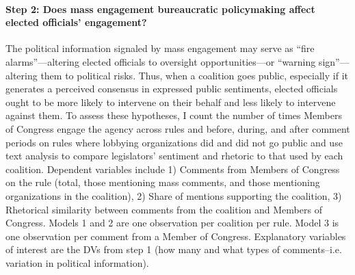 \paragraph{Step 2: Does mass engagement bureaucratic policymaking affect elected officials' engagement?}
The political information signaled by mass engagement may serve as ``fire alarms''---altering elected officials to oversight opportunities---or ``warning sign''---altering them to political risks.
Thus, when a coalition goes public, especially if it generates a perceived consensus in expressed public sentiments, elected officials ought to be more likely to intervene on their behalf and less likely to intervene against them.  
To assess these hypotheses, I count the number of times Members of Congress engage the agency across rules and before, during, and after comment periods on rules where lobbying organizations did and did not go public and use text analysis to compare legislators' sentiment and rhetoric to that used by each coalition.
Dependent variables include 1) Comments from Members of Congress on the rule (total, those mentioning mass comments, and those mentioning organizations in the coalition), %
2) Share of mentions supporting the coalition, %
3) Rhetorical similarity between comments from the coalition and Members of Congress. 
Models 1 and 2 are one observation per coalition per rule. Model 3 is one observation per comment from a Member of Congress. Explanatory variables of interest are the DVs from step 1 (how many and what types of comments--i.e. variation in political information).%

